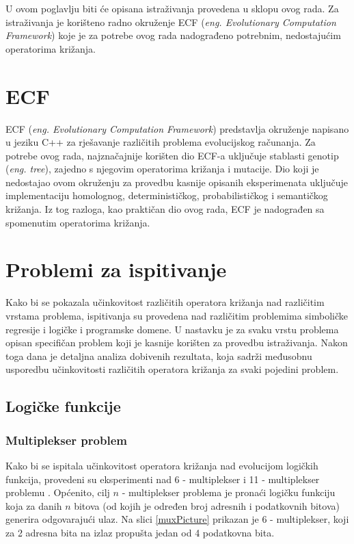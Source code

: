 U ovom poglavlju biti će opisana istraživanja provedena u sklopu ovog rada. Za istraživanja je korišteno radno okruženje ECF (\textit{eng. Evolutionary Computation Framework}) koje je za potrebe ovog rada nadograđeno potrebnim, nedostajućim  operatorima križanja.

\section{ECF}
ECF \cite{ecf} (\textit{eng. Evolutionary Computation Framework}) predstavlja okruženje napisano u jeziku C++ za rješavanje različitih problema evolucijskog računanja. Za potrebe ovog rada, najznačajnije korišten dio ECF-a uključuje stablasti genotip (\textit{eng. tree}), zajedno s njegovim operatorima križanja i mutacije. Dio koji je nedostajao ovom okruženju za provedbu kasnije opisanih eksperimenata uključuje implementaciju homolognog, determinističkog, probabilističkog i semantičkog križanja. Iz tog razloga, kao praktičan dio ovog rada, ECF je nadograđen sa spomenutim operatorima križanja.

\section{Problemi za ispitivanje}

Kako bi se pokazala učinkovitost različitih operatora križanja nad različitim vrstama problema, ispitivanja su provedena nad različitim problemima simboličke regresije i logičke i programske domene. U nastavku je za svaku vrstu problema opisan specifičan problem koji je kasnije korišten za provedbu istraživanja. Nakon toga dana je detaljna analiza dobivenih rezultata, koja sadrži međusobnu usporedbu učinkovitosti različitih operatora križanja za svaki pojedini problem.

\subsection{Logičke funkcije}

\subsubsection{Multiplekser problem}
Kako bi se ispitala učinkovitost operatora križanja nad evolucijom logičkih funkcija, provedeni su eksperimenti nad 6 - multiplekser i 11 - multiplekser problemu \cite{koza}. Općenito, cilj $n$ - multiplekser problema je pronaći logičku funkciju koja za danih $n$ bitova (od kojih je određen broj adresnih i podatkovnih bitova) generira odgovarajući ulaz. Na slici \ref{muxPicture} prikazan je 6 - multiplekser, koji za 2 adresna bita na izlaz propušta jedan od 4 podatkovna bita.

